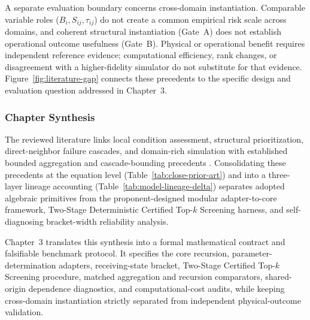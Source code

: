 A separate evaluation boundary concerns cross-domain instantiation.
Comparable variable roles ($B_i, S_{ij}, \tau_{ij}$) do not create a
common empirical risk scale across domains, and coherent structural
instantiation (Gate~A) does not establish operational outcome usefulness
(Gate~B). Physical or operational benefit requires independent reference
evidence; computational efficiency, rank changes, or disagreement with a
higher-fidelity simulator do not substitute for that evidence.
Figure~\ref{fig:literature-gap} connects these precedents to the
specific design and evaluation question addressed in Chapter~3.



\subsubsection{Chapter Synthesis}\label{chapter-synthesis}

The reviewed literature links local condition assessment, structural
prioritization, direct-neighbor failure cascades, and domain-rich
simulation with established bounded aggregation and cascade-bounding
precedents \citep{klement2004,fallet2012,faraji2026,abbe2020,chen2010mia}.
Consolidating these precedents at the equation level
(Table~\ref{tab:close-prior-art}) and into a three-layer lineage
accounting (Table~\ref{tab:model-lineage-delta}) separates adopted
algebraic primitives from the proponent-designed modular adapter-to-core
framework, Two-Stage Deterministic Certified Top-$k$ Screening harness,
and self-diagnosing bracket-width reliability analysis.

Chapter~3 translates this synthesis into a formal mathematical contract
and falsifiable benchmark protocol. It specifies the core recursion,
parameter-determination adapters, receiving-state bracket, Two-Stage
Certified Top-$k$ Screening procedure, matched aggregation and recursion
comparators, shared-origin dependence diagnostics, and computational-cost
audits, while keeping cross-domain instantiation strictly separated from
independent physical-outcome validation.
